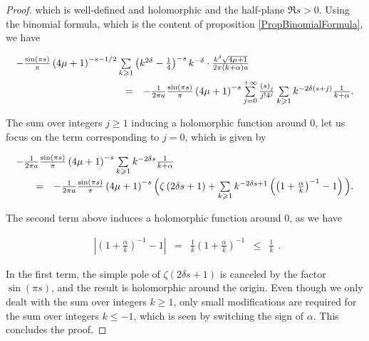 \documentclass{jams-l}
\theoremstyle{definition}
\theoremstyle{remark}
\numberwithin{equation}{section}
\begin{document}
\begin{proof}
                \noindent which is well-defined and holomorphic and the half-plane $\Re s > 0$.  Using the binomial formula, which is the content of proposition \ref{PropBinomialFormula}, we have
                
                \[ \begin{array}{lll}
                        \multicolumn{3}{l}{- \frac{\sin \left( \pi s \right)}{\pi} \left( 4 \mu + 1 \right)^{-s-1/2} \sum\limits_{k \geqslant 1} \left( k^{2 \delta} - \frac{1}{4} \right)^{-s} k^{-\delta} \cdot \frac{k^{\delta} \sqrt{4 \mu + 1}}{2 \pi \left( k + \alpha \right) a}} \\[1em]
                        
                        \qquad \qquad \qquad \qquad \qquad & = & - \frac{1}{2 \pi a} \frac{\sin \left( \pi s \right)}{\pi} \left( 4 \mu + 1 \right)^{-s} \sum\limits_{j = 0}^{+ \infty} \frac{\left( s \right)_j}{j! 4^j} \sum\limits_{k \geqslant 1} k^{-2 \delta \left( s + j \right)} \frac{1}{k + \alpha}.
                    \end{array} \]
                
                \noindent The sum over integers $j \geqslant 1$ inducing a holomorphic function around $0$, let us focus on the term corresponding to $j=0$, which is given by
                
                \[ \begin{array}{lll}
                        \multicolumn{3}{l}{- \frac{1}{2 \pi a} \frac{\sin \left( \pi s \right)}{\pi} \left( 4 \mu + 1 \right)^{-s} \sum\limits_{k \geqslant 1} k^{-2 \delta s} \frac{1}{k + \alpha}} \\[1em]
                        
                        \quad & = & - \frac{1}{2 \pi a} \frac{\sin \left( \pi s \right)}{\pi} \left( 4 \mu + 1 \right)^{-s} \Big( \zeta \left( 2 \delta s + 1 \right) + \sum\limits_{k \geqslant 1} k^{-2 \delta s + 1} \left( \left( 1 + \frac{\alpha}{k} \right)^{-1} - 1 \right) \Big).
                    \end{array} \]
                
                \noindent The second term above induces a holomorphic function around $0$, as we have
                
                \[ \begin{array}{lllll}
                        \left \vert \left( 1 + \frac{\alpha}{k} \right)^{-1} - 1 \right \vert & = & \frac{1}{k} \left( 1 + \frac{\alpha}{k} \right)^{-1} & \leqslant & \frac{1}{k}
                    \end{array} . \]
                
                 \noindent In the first term, the simple pole of $\zeta \left( 2 \delta s + 1 \right)$ is canceled by the factor $\sin \left( \pi s \right)$, and the result is holomorphic around the origin. Even though we only dealt with the sum over integers $k \geqslant 1$, only small modifications are required for the sum over integers $k \leqslant -1$, which is seen by switching the sign of $\alpha$. This concludes the proof.
                
            
            \end{proof}
            
\end{document}
